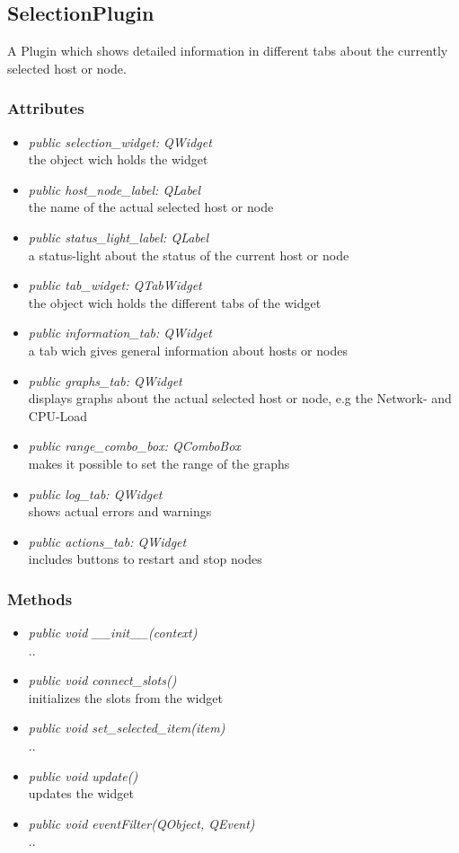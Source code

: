 \subsection{SelectionPlugin}
A Plugin which shows detailed information in different tabs about the currently
selected host or node.
\subsubsection{Attributes}
\begin{itemize}
  \item \textit{public selection\_widget: QWidget}\\
  the object wich holds the widget
  \item \textit{public host\_node\_label: QLabel}\\
  the name of the actual selected host or node
  \item \textit{public status\_light\_label: QLabel}\\
  a status-light about the status of the current host or node
  \item \textit{public tab\_widget: QTabWidget}\\
  the object wich holds the different tabs of the widget
  \item \textit{public information\_tab: QWidget}\\
  a tab wich gives general information about hosts or nodes 
  \item \textit{public graphs\_tab: QWidget}\\
  displays graphs about the actual selected host or node, e.g the Network- and
  CPU-Load
  \item \textit{public range\_combo\_box: QComboBox}\\
  makes it possible to set the range of the graphs
  \item \textit{public log\_tab: QWidget}\\
  shows actual errors and warnings
  \item \textit{public actions\_tab: QWidget}\\
  includes buttons to restart and stop nodes  
\end{itemize}
\subsubsection{Methods}
\begin{itemize}
  \item \textit{public void \_\_init\_\_(context)}\\
  ..
  \item \textit{public void connect\_slots()}\\
  initializes the slots from the widget
  \item \textit{public void set\_selected\_item(item)}\\
  ..
  \item \textit{public void update()}\\
  updates the widget
  \item \textit{public void eventFilter(QObject, QEvent)}\\
  ..
\end{itemize}

